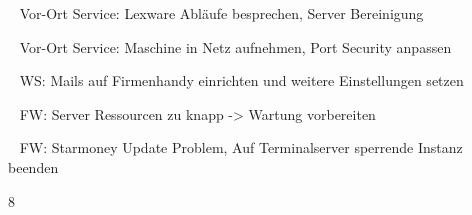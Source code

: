 {{	\textbullet~ Vor-Ort Service: Lexware Abläufe besprechen, Server Bereinigung \par
	\textbullet~ Vor-Ort Service: Maschine in Netz aufnehmen, Port Security anpassen\par
	\textbullet~ WS: Mails auf Firmenhandy einrichten und weitere Einstellungen setzen\par
	\textbullet~ FW: Server Ressourcen zu knapp -> Wartung vorbereiten\par
	\textbullet~ FW: Starmoney Update Problem, Auf Terminalserver sperrende Instanz beenden
	}{}{8}
}{}
\Unterschrift
\newpage
